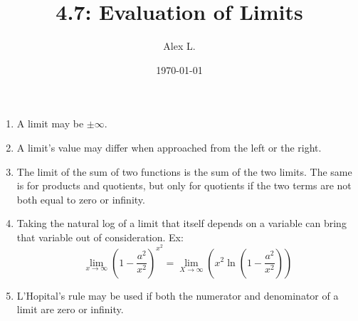 \documentclass{article}
\title{4.7: Evaluation of Limits}
\author{Alex L.}
\date{\today}
\begin{document}
\maketitle

\begin{enumerate}
    \item A limit may be $\pm \infty$.
    \item A limit's value may differ when approached from the left or the right.
    \item The limit of the sum of two functions is the sum of the two limits. The same is for products and quotients, but only for quotients if the two terms are not both equal to zero or infinity. 
    \item Taking the natural log of a limit that itself depends on a variable can bring that variable out of consideration. Ex: $$\lim_{x\to\infty} (1-\frac{a^2}{x^2})^{x^2} = \lim_{X\to\infty}(x^2 \ln (1-\frac{a^2}{x^2}))$$
    \item L'Hopital's rule may be used if both the numerator and denominator of a limit are zero or infinity.
\end{enumerate}
\end{document}
